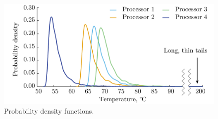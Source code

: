 \begin{figure}[br]
  \vspace{-1.5em}
  \centering
  \includegraphics[width=1.0\linewidth]{include/assets/motivation-pdf.pdf}
  \caption{Probability density functions.}
  \vspace{-1.0em}
\end{figure}
